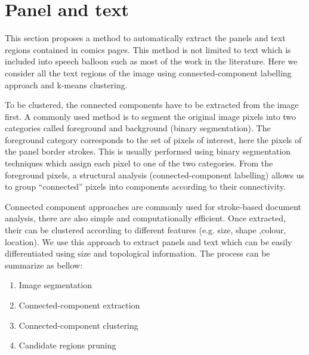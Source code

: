
\section{Panel and text} %
\label{sec:se:panel_and_text}


This section proposes a method to automatically extract the panels and text regions contained in comics pages.
This method is not limited to text which is included into speech balloon such as most of the work in the literature.
Here we consider all the text regions of the image using connected-component labelling approach and k-means clustering.


To be clustered, the connected components have to be extracted from the image first.
A commonly used method is to segment the original image pixels into two categories called foreground and background (binary segmentation).
The foreground category corresponds to the set of pixels of interest, here the pixels of the panel border strokes.
This is usually performed using binary segmentation techniques which assign each pixel to one of the two categories.
From the foreground pixels, a structural analysis (connected-component labelling) allows us to group ``connected'' pixels into components according to their connectivity.

Connected component approaches are commonly used for stroke-based document analysis, there are also simple and computationally efficient.
Once extracted, their can be clustered according to different features (e.g. size, shape ,colour, location).
We use this approach to extract panels and text which can be easily differentiated using size and topological information.
The process can be summarize as bellow:
  \begin{enumerate}
	\item Image segmentation
	\item Connected-component extraction
	\item Connected-component clustering
	\item Candidate regions pruning
  \end{enumerate}



